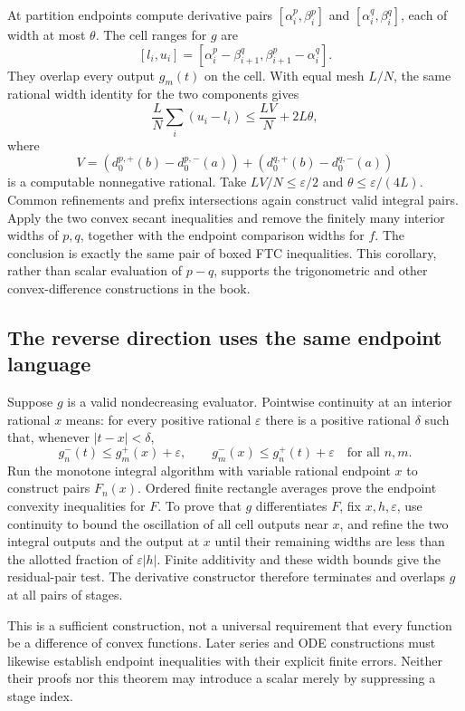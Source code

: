 At partition endpoints compute derivative pairs
$[\alpha_i^p,\beta_i^p]$ and $[\alpha_i^q,\beta_i^q]$, each of width
at most $\theta$.  The cell ranges for $g$ are
\[
 [l_i,u_i]=[\alpha_i^p-\beta_{i+1}^q,
                   \beta_{i+1}^p-\alpha_i^q].
\]
They overlap every output $g_m(t)$ on the cell.  With equal mesh $L/N$,
the same rational width identity for the two components gives
\[
 \frac LN\sum_i(u_i-l_i)\le\frac{LV}{N}+2L\theta,
\]
where
\[
 V=(d_0^{p,+}(b)-d_0^{p,-}(a))
      +(d_0^{q,+}(b)-d_0^{q,-}(a))
\]
is a computable nonnegative rational.  Take $LV/N\le\varepsilon/2$
and $\theta\le\varepsilon/(4L)$.  Common refinements and prefix
intersections again construct valid integral pairs.  Apply the two
convex secant inequalities and remove the finitely many interior widths
of $p,q$, together with the endpoint comparison widths for $f$.
The conclusion is exactly the same pair of boxed FTC inequalities.
This corollary, rather than scalar evaluation of $p-q$, supports the
trigonometric and other convex-difference constructions in the book.

\subsection{The reverse direction uses the same endpoint language}
Suppose $g$ is a valid nondecreasing evaluator.  Pointwise continuity at
an interior rational $x$ means: for every positive rational $\varepsilon$
there is a positive rational $\delta$ such that, whenever $|t-x|<\delta$,
\[
 g_n^-(t)\le g_m^+(x)+\varepsilon,\qquad
 g_m^-(x)\le g_n^+(t)+\varepsilon
 \quad\text{for all }n,m.
\]
Run the monotone integral algorithm with variable rational endpoint $x$
to construct pairs $F_n(x)$.  Ordered finite rectangle averages prove
the endpoint convexity inequalities for $F$.  To prove that $g$
differentiates $F$, fix $x,h,\varepsilon$, use continuity to bound the
oscillation of all cell outputs near $x$, and refine the two integral
outputs and the output at $x$ until their remaining widths are less
than the allotted fraction of $\varepsilon|h|$.  Finite additivity and
these width bounds give the residual-pair test.  The derivative constructor
therefore terminates and overlaps $g$ at all pairs of stages.

This is a sufficient construction, not a universal requirement that every
function be a difference of convex functions.  Later series and ODE
constructions must likewise establish endpoint inequalities with their
explicit finite errors.  Neither their proofs nor this theorem may
introduce a scalar merely by suppressing a stage index.
